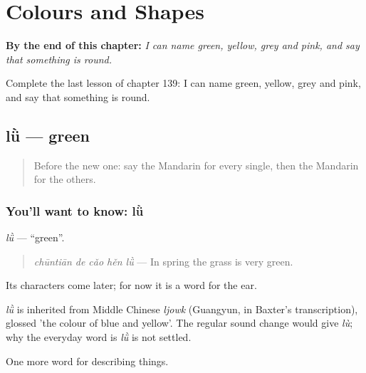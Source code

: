 
\chapter{Colours and Shapes}
\label{ch:zh-colours-and-shapes}

\begin{chapteropening}
\textbf{By the end of this chapter:} \emph{I can name green, yellow, grey and pink, and say that something is round.}

Complete the last lesson of chapter 139: I can name green, yellow, grey and pink, and say that something is round.
\end{chapteropening}

\section[lǜ]{lǜ — green}

\label{lesson:ZH-C139-lu}



\begin{quote}
Before the new one: say the Mandarin for every single, then the Mandarin for the others.
\end{quote}

\subsection*{You'll want to know: lǜ}
\emph{lǜ} — \textquotedblleft{}green\textquotedblright{}.

\begin{quote}
\emph{chūntiān de cǎo hěn lǜ} — In spring the grass is very green.
\end{quote}

Its characters come later; for now it is a word for the ear.

\begin{cousinweb}
\emph{lǜ} is inherited from Middle Chinese \emph{ljowk} (Guangyun, in Baxter's transcription), glossed 'the colour of blue and yellow'. The regular sound change would give \emph{lù}; why the everyday word is \emph{lǜ} is not settled.
\end{cousinweb}

\begin{grammarlens}[title={What you've built}]
One more word for describing things.
\end{grammarlens}

